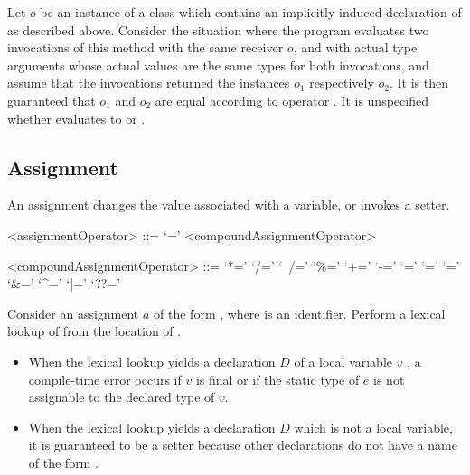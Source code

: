 \documentclass[makeidx]{article}
\begin{document}
{{\LMHash{}%
Let $o$ be an instance of a class which contains
an implicitly induced declaration of \gmiName{}
as described above.
%
Consider the situation where the program evaluates
two invocations of this method with the same receiver $o$,
and with actual type arguments whose actual values are
the same types  for both invocations,
and assume that the invocations returned
the instances $o_1$ respectively $o_2$.
%
It is then guaranteed that $o_1$ and $o_2$ are equal
according to operator \lit{==}.
It is unspecified whether
evaluates to \TRUE{} or \FALSE.

} %



\subsection{Assignment}

\LMHash{}%
An assignment changes the value associated with a variable,
or invokes a setter.

\begin{grammar}
<assignmentOperator> ::= `='
  \alt <compoundAssignmentOperator>

<compoundAssignmentOperator> ::= `*='
  \alt `/='
  \alt `~/='
  \alt `\%='
  \alt `+='
  \alt `-='
  \alt `\ltlt='
  \alt `\gtgtgt='
  \alt `\gtgt='
  \alt `\&='
  \alt `^='
  \alt `|='
  \alt `??='
\end{grammar}

\LMHash{}%
Consider an assignment $a$ of the form ,
where \id{} is an identifier.
Perform a lexical lookup of \code{\id=} from the location of \id.

\begin{itemize}
\item
  When the lexical lookup yields a declaration $D$ of a local variable $v$
  ,
  a compile-time error occurs if $v$ is final
  or if the static type of $e$ is not assignable to the declared type of $v$.
\item
  When the lexical lookup yields a declaration $D$
  which is not a local variable,
  it is guaranteed to be a setter
  because other declarations do not have a name
  of the form \code{\id=}.


\end{itemize}}
\end{document}
